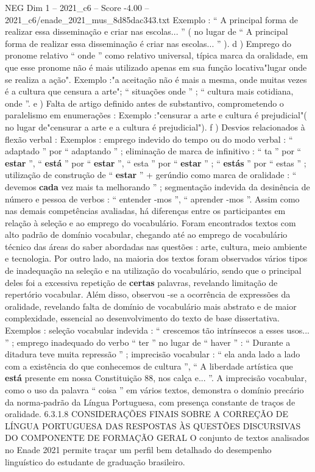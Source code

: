 \begin{textsample}{NEG Dim 1 – 2021\_c6 – Score -4.00 – 2021\_c6/enade\_2021\_mus\_8d85dac343.txt}
Exemplo : “ A principal forma de realizar essa disseminação e criar nas escolas... ” ( no lugar de “ A principal forma de realizar essa disseminação é criar nas escolas... ” ). d ) Emprego do pronome relativo “ onde ” como relativo universal, típica marca da oralidade, em que esse pronome não é mais utilizado apenas em sua função locativa"lugar onde se realiza a ação".
Exemplo :"a aceitação não é mais a mesma, onde muitas vezes é a cultura que censura a arte"; “ situações onde ” ; “ cultura mais cotidiana, onde ”. e ) Falta de artigo definido antes de substantivo, comprometendo o paralelismo em enumerações : Exemplo :"censurar a arte e cultura é prejudicial"( no lugar de"censurar a arte e a cultura é prejudicial"). f ) Desvios relacionados à flexão verbal : Exemplos : emprego indevido do tempo ou do modo verbal : “ adaptado ” por “ adaptando ” ; eliminação de marca de infinitivo : “ ta ” por “ \textbf{estar} ”, “ \textbf{está} ” por “ \textbf{estar} ”, “ esta ” por “ \textbf{estar} ” ; “ \textbf{estás} ” por “ estas ” ; utilização de construção de “ \textbf{estar} ” + gerúndio como marca de oralidade : “ devemos \textbf{cada} vez mais ta melhorando ” ; segmentação indevida da desinência de número e pessoa de verbos : “ entender -mos ”, “ aprender -mos ”.
Assim como nas demais competências avaliadas, há diferenças entre os participantes em relação à seleção e ao emprego do vocabulário.
Foram encontrados textos com alto padrão de domínio vocabular, chegando até ao emprego de vocabulário técnico das áreas do saber abordadas nas questões : arte, cultura, meio ambiente e tecnologia.
Por outro lado, na maioria dos textos foram observados vários tipos de inadequação na seleção e na utilização do vocabulário, sendo que o principal deles foi a excessiva repetição de \textbf{certas} palavras, revelando limitação de repertório vocabular.
Além disso, observou -se a ocorrência de expressões da oralidade, revelando falta de domínio de vocabulário mais abstrato e de maior complexidade, essencial ao desenvolvimento do texto de base dissertativa.
Exemplos : seleção vocabular indevida : “ crescemos tão intrínsecos a esses usos... ” ; emprego inadequado do verbo “ ter ” no lugar de “ haver ” : “ Durante a ditadura teve muita repressão ” ; imprecisão vocabular : “ ela anda lado a lado com a existência do que conhecemos de cultura ”, “ A liberdade artística que \textbf{está} presente em nossa Constituição 88, nos calça e... ”.
A imprecisão vocabular, como o uso da palavra “ coisa ” em vários textos, demonstra o domínio precário da norma-padrão da Língua Portuguesa, com presença constante de traços de oralidade. 6.3.1.8 CONSIDERAÇÕES FINAIS SOBRE A CORREÇÃO DE LÍNGUA PORTUGUESA DAS RESPOSTAS ÀS QUESTÕES DISCURSIVAS DO COMPONENTE DE FORMAÇÃO GERAL O conjunto de textos analisados no Enade 2021 permite traçar um perfil bem detalhado do desempenho linguístico do estudante de graduação brasileiro.

\end{textsample}

